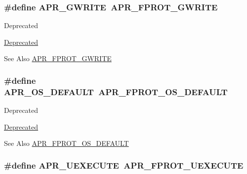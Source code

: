 \hypertarget{group__apr__file__permissions_ga794c425b459aa46939f6febabbe9daef}{
\subsubsection[{A\-P\-R\-\_\-\-G\-W\-R\-I\-T\-E}]{\setlength{\rightskip}{0pt plus 5cm}\#define A\-P\-R\-\_\-\-G\-W\-R\-I\-T\-E~{\bf A\-P\-R\-\_\-\-F\-P\-R\-O\-T\-\_\-\-G\-W\-R\-I\-T\-E}}}\label{group__apr__file__permissions_ga794c425b459aa46939f6febabbe9daef}
\begin{DoxyRefDesc}{Deprecated}
\item[\hyperlink{deprecated__deprecated000009}{Deprecated}]\end{DoxyRefDesc}
\begin{DoxySeeAlso}{See Also}
\hyperlink{group__apr__file__permissions_gacecdc9f88b04c768150418688b786500}{A\-P\-R\-\_\-\-F\-P\-R\-O\-T\-\_\-\-G\-W\-R\-I\-T\-E} 
\end{DoxySeeAlso}
\hypertarget{group__apr__file__permissions_ga8552adb50d545d5fc7faeabb4f4a388f}{
\subsubsection[{A\-P\-R\-\_\-\-O\-S\-\_\-\-D\-E\-F\-A\-U\-L\-T}]{\setlength{\rightskip}{0pt plus 5cm}\#define A\-P\-R\-\_\-\-O\-S\-\_\-\-D\-E\-F\-A\-U\-L\-T~{\bf A\-P\-R\-\_\-\-F\-P\-R\-O\-T\-\_\-\-O\-S\-\_\-\-D\-E\-F\-A\-U\-L\-T}}}\label{group__apr__file__permissions_ga8552adb50d545d5fc7faeabb4f4a388f}
\begin{DoxyRefDesc}{Deprecated}
\item[\hyperlink{deprecated__deprecated000015}{Deprecated}]\end{DoxyRefDesc}
\begin{DoxySeeAlso}{See Also}
\hyperlink{group__apr__file__permissions_gad3c65a67ee6eb12ecc6a33857397900b}{A\-P\-R\-\_\-\-F\-P\-R\-O\-T\-\_\-\-O\-S\-\_\-\-D\-E\-F\-A\-U\-L\-T} 
\end{DoxySeeAlso}
\hypertarget{group__apr__file__permissions_ga4c08d7e798ab4022e31ed70f06f202b5}{
\subsubsection[{A\-P\-R\-\_\-\-U\-E\-X\-E\-C\-U\-T\-E}]{\setlength{\rightskip}{0pt plus 5cm}\#define A\-P\-R\-\_\-\-U\-E\-X\-E\-C\-U\-T\-E~{\bf A\-P\-R\-\_\-\-F\-P\-R\-O\-T\-\_\-\-U\-E\-X\-E\-C\-U\-T\-E}}}\label{group__apr__file__permissions_ga4c08d7e798ab4022e31ed70f06f202b5}
